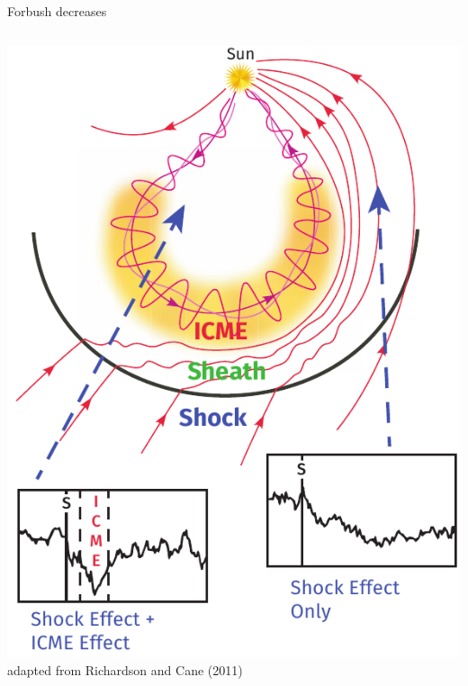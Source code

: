 \documentclass[10pt,aspectratio=169,usenames,dvipsnames]{beamer}
\begin{document}
\begin{frame}{Forbush decreases}
\begin{columns}[T]
\begin{column}{0.35\textwidth}
            \includegraphics[width=\textwidth]{images/RichardsonCane-adapted.pdf}
            \scriptsize adapted from Richardson and Cane (2011)
        \end{column}
    \end{columns}
\end{frame}
\end{document}
